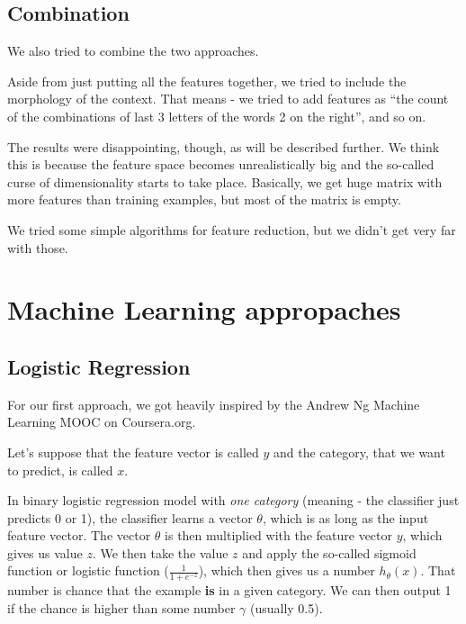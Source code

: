 \documentclass[letterpaper]{article}
\begin{document}
\subsection{Combination}
We also tried to combine the two approaches.

Aside from just putting all the features together, we tried to include the morphology of the context. 
That means - we tried to add features as ``the count of the combinations of last 3 letters of the words 2 on the right'', and so on.

The results were disappointing, though, as will be described further. 
We think this is because the feature space becomes unrealistically big and the so-called  curse of dimensionality starts to take place. Basically, we get huge matrix with more features than training examples, but most of the matrix is empty.

We tried some simple algorithms for feature reduction, but we didn't get very far with those.

\section{Machine Learning appropaches}
\subsection{Logistic Regression}
For our first approach, we got heavily inspired by the Andrew Ng Machine Learning MOOC  on Coursera.org.

Let's suppose that the feature vector is called $y$ and the category, that we want to predict, is called $x$.

In binary logistic regression model with \emph{one category} (meaning - the classifier just predicts 0 or 1), the classifier learns a vector $\theta$, which is as long as the input feature vector. The vector $\theta$ is then multiplied with the feature vector $y$, which gives us value $z$. We then take the value $z$ and apply the so-called sigmoid function or logistic function ($\frac{1}{1+e^{-z}}$), which then gives us a number $h_\theta(x)$. That number is chance that the example \textbf{is} in a given category. We can then output 1 if the chance is higher than some number $\gamma$ (usually 0.5).
\end{document}
